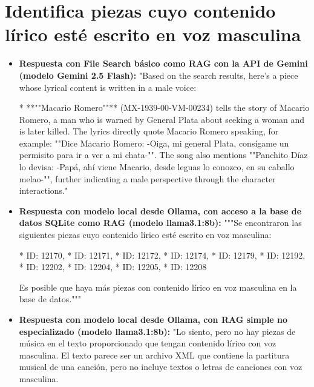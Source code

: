 \section{Identifica piezas cuyo contenido lírico esté escrito en voz masculina}
\begin{itemize}
    \item \textbf{Respuesta con File Search básico como RAG con la API de Gemini (modelo Gemini 2.5 Flash):} "Based on the search results, here's a piece whose lyrical content is written in a male voice:

*   **""Macario Romero""** (MX-1939-00-VM-00234) tells the story of Macario Romero, a man who is warned by General Plata about seeking a woman and is later killed. The lyrics directly quote Macario Romero speaking, for example: ""Dice Macario Romero: -Oiga, mi general Plata, consígame un permisito para ir a ver a mi chata-"". The song also mentions ""Panchito Díaz lo devisa: -Papá, ahí viene Macario, desde leguas lo conozco, en su caballo melao-"", further indicating a male perspective through the character interactions."
    \item \textbf{Respuesta con modelo local desde Ollama, con acceso a la base de datos SQLite como RAG (modelo llama3.1:8b):} """Se encontraron las siguientes piezas cuyo contenido lírico esté escrito en voz masculina:

* ID: 12170,
* ID: 12171,
* ID: 12172,
* ID: 12174,
* ID: 12179,
* ID: 12192,
* ID: 12202,
* ID: 12204,
* ID: 12205,
* ID: 12208

Es posible que haya más piezas con contenido lírico en voz masculina en la base de datos."""
\item \textbf{Respuesta con modelo local desde Ollama, con RAG simple no especializado (modelo llama3.1:8b):} "Lo siento, pero no hay piezas de música en el texto proporcionado que tengan contenido lírico con voz masculina. El texto parece ser un archivo XML que contiene la partitura musical de una canción, pero no incluye textos o letras de canciones con voz masculina.


\end{itemize}
